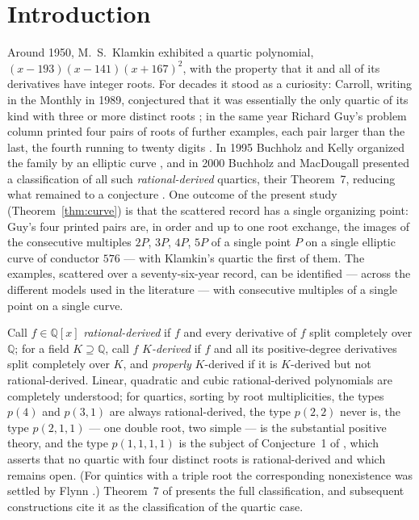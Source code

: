\documentclass[11pt]{amsart}
\newcommand{\Q}{\mathbb{Q}}
\begin{document}
\maketitle

\section{Introduction}\label{sec:intro}

Around 1950, M.~S.~Klamkin exhibited a quartic polynomial,
$(x-193)(x-141)(x+167)^2$, with the property that it and all of its
derivatives have integer roots.  For decades it stood as a curiosity:
Carroll, writing in the Monthly in 1989, conjectured that it was
essentially the only quartic of its kind with three or more distinct
roots \cite{Carroll1989}; in the same year Richard Guy's problem column
printed four pairs of roots of further examples, each pair larger than
the last, the fourth running to twenty digits \cite{Guy1989}.  In 1995
Buchholz and Kelly organized the family by an elliptic curve
\cite{BK1995}, and in 2000 Buchholz and MacDougall presented a
classification of all such \emph{rational-derived} quartics, their
Theorem~7, reducing what remained to a conjecture \cite{BM2000}.  One
outcome of the present study (Theorem~\ref{thm:curve}) is that the
scattered record has a single organizing point: Guy's four printed
pairs are, in order and up to one root exchange, the images of the
consecutive multiples $2P$, $3P$, $4P$, $5P$ of a single point $P$ on a
single elliptic curve of conductor $576$ --- with Klamkin's quartic the
first of them.  The examples, scattered over a seventy-six-year record, can be
identified --- across the different models used in the literature ---
with consecutive multiples of a single point on a single curve.

Call $f\in\Q[x]$ \emph{rational-derived} if $f$ and every derivative of
$f$ split completely over $\Q$; for a field $K\supseteq\Q$, call $f$
\emph{$K$-derived} if $f$ and all its positive-degree derivatives split
completely over $K$, and \emph{properly} $K$-derived if it is
$K$-derived but not rational-derived.  Linear, quadratic and cubic
rational-derived polynomials are completely understood; for quartics,
sorting by root multiplicities, the types $p(4)$ and $p(3,1)$ are
always rational-derived, the type $p(2,2)$ never is, the type
$p(2,1,1)$ --- one double root, two simple --- is the substantial
positive theory, and the type $p(1,1,1,1)$ is the subject of
Conjecture~1 of \cite{BM2000}, which asserts that no quartic with four
distinct roots is rational-derived and which remains open.  (For
quintics with a triple root the corresponding nonexistence was settled
by Flynn \cite{Flynn2001}.)  Theorem~7 of \cite{BM2000} presents the
full classification, and subsequent constructions
\cite{BC2016,Carrillo2019} cite it as the classification of the
quartic case.
\end{document}

